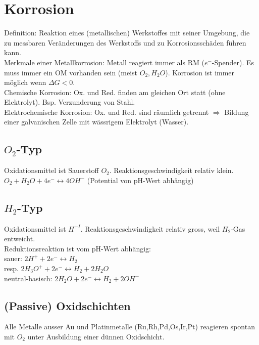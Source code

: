 \section{Korrosion}
Definition: Reaktion eines (metallischen) Werkstoffes mit seiner Umgebung, die zu messbaren Veränderungen des Werkstoffs und zu Korrosionsschäden führen kann. \\

Merkmale einer Metallkorrosion: Metall reagiert immer als RM ($e^-$-Spender). Es muss immer ein OM vorhanden sein (meist $O_2, H_2O$). Korrosion ist immer möglich wenn $\Delta G  < 0$. \\

Chemische Korrosion: Ox. und Red. finden am gleichen Ort statt (ohne Elektrolyt). Bsp. Verzunderung von Stahl. \\

Elektrochemische Korrosion: Ox. und Red. sind räumlich getrennt $\Rightarrow$ Bildung einer galvanischen Zelle mit wässrigem Elektrolyt (Wasser). \\

\subsection{$O_2$-Typ}
Oxidationsmittel ist Sauerstoff $O_2$. Reaktionsgeschwindigkeit relativ klein. \\
$O_2 + H_2O + 4 e^- \leftrightarrow 4 OH^-$ (Potential von pH-Wert abhängig)\\

\subsection{$H_2$-Typ}
Oxidationsmittel ist $H^{+I}$. Reaktionsgeschwindigkeit relativ gross, weil $H_2$-Gas entweicht.  \\

Reduktionsreaktion ist vom pH-Wert abhängig: \\
sauer: $2 H^+ + 2 e^- \leftrightarrow H_2$ \\ resp. $2 H_3O^+ + 2 e^- \leftrightarrow H_2 + 2 H_2O$ \\
neutral-basisch: $2 H_2O + 2 e^- \leftrightarrow H_2 + 2 OH^-$ \\

\subsection{(Passive) Oxidschichten}
Alle Metalle ausser Au und Platinmetalle (Ru,Rh,Pd,Os,Ir,Pt) reagieren spontan mit $O_2$ unter Ausbildung einer dünnen Oxidschicht. \\

